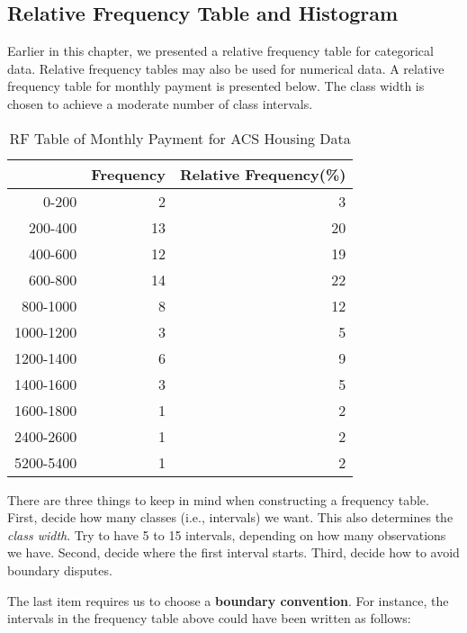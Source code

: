 \documentclass[11pt]{book}\usepackage[]{graphicx}\usepackage[]{color}
\begin{document}
\subsection{Relative Frequency Table and Histogram}

Earlier in this chapter, we presented a relative frequency table for categorical data.  Relative frequency tables may also be used for numerical data.  A relative frequency table for monthly payment is presented below.  The class width is chosen to achieve a moderate number of class intervals.

{\small{
\begin{table}[ht]
\centering
\begin{tabular}{rrr}
  \hline
 & Frequency & Relative Frequency(\%) \\ 
  \hline
0-200 & 2 & 3 \\ 
  200-400 & 13 & 20 \\ 
  400-600 & 12 & 19 \\ 
  600-800 & 14 & 22 \\ 
  800-1000 & 8 & 12 \\ 
  1000-1200 & 3 & 5 \\ 
  1200-1400 & 6 & 9 \\ 
  1400-1600 & 3 & 5 \\ 
  1600-1800 & 1 & 2 \\ 
  2400-2600 & 1 & 2 \\ 
  5200-5400 & 1 & 2 \\ 
   \hline
\end{tabular}
\caption{RF Table of Monthly Payment for ACS Housing Data} 
\end{table}

}}

There are three things to keep in mind when constructing a frequency table. First, decide how many classes (i.e., intervals) we want.  This also determines the \textit{class width}.  Try to have 5 to 15 intervals, depending on how many observations we have. Second, decide where the first interval starts.  Third, decide how to avoid boundary disputes.

The last item requires us to choose a \textbf{boundary convention}.  For instance, the intervals in the frequency table above could have been written as follows:

\vspace{3mm}
\end{document}
